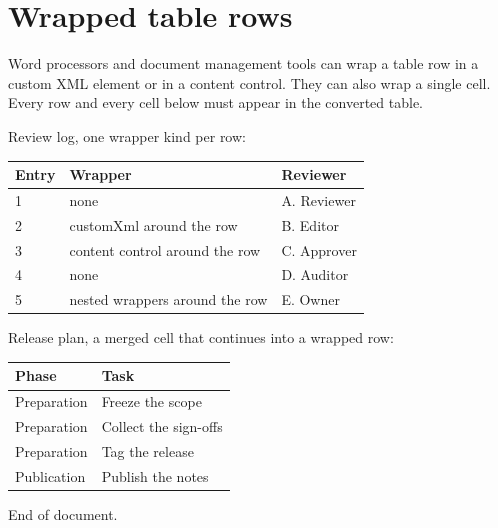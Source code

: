 \documentclass[11pt,a4paper]{article}
\begin{document}
\section{Wrapped table rows}

Word processors and document management tools can wrap a table row in a custom XML element or in a content control. They can also wrap a single cell. Every row and every cell below must appear in the converted table.

Review log, one wrapper kind per row:

\begin{table}[h]
\begin{tabular}{|l|l|l|}
\hline
Entry & Wrapper & Reviewer \\ \hline
1 & none & A. Reviewer \\ \hline
2 & customXml around the row & B. Editor \\ \hline
3 & content control around the row & C. Approver \\ \hline
4 & none & D. Auditor \\ \hline
5 & nested wrappers around the row & E. Owner \\ \hline
\end{tabular}
\end{table}

Release plan, a merged cell that continues into a wrapped row:

\begin{table}[h]
\begin{tabular}{|l|l|}
\hline
Phase & Task \\ \hline
Preparation & Freeze the scope \\ \hline
Preparation & Collect the sign-offs \\ \hline
Preparation & Tag the release \\ \hline
Publication & Publish the notes \\ \hline
\end{tabular}
\end{table}

End of document.
\end{document}
